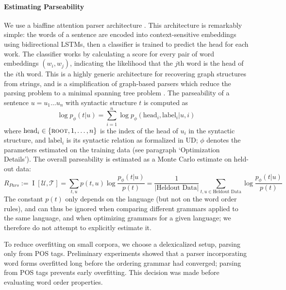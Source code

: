 \documentclass[10pt,twoside,lineno]{article}
\newcommand{\utterance}{\mathcal{U}}
\newcommand{\tree}{\mathcal{T}}
\begin{document}
\paragraph{Estimating Parseability}
We use a biaffine attention parser architecture \citep{kiperwasser2016simple,zhang2017dependency,dozat2017stanford}. This architecture is remarkably simple: the words of a sentence are encoded into context-sensitive embeddings using bidirectional LSTMs, then a classifier is trained to predict the head for each work. The classifier works by calculating a score for every pair of word embeddings $(w_i, w_j)$, indicating the likelihood that the $j$th word is the head of the $i$th word. This is a highly generic architecture for recovering graph structures from strings, and is a simplification of graph-based parsers which reduce the parsing problem to a minimal spanning tree problem \citep{mcdonald2005nonprojective}.
The parseability of a sentence $u = u_1\dots u_n$ with syntactic structure $t$ is computed as
\begin{equation}
	\log p_\phi(t|u) = \sum_{i=1}^n \log p_\phi(\text{head}_i, \text{label}_i | u, i)
\end{equation}\label{eq:pars-obj}
where $\text{head}_i \in \{\textsc{root}, 1,\dots,n\}$ is the index of the head of $u_i$ in the syntactic structure, and $\text{label}_i$ is its syntactic relation as formalized in UD; $\phi$ denotes the parameters estimated on the training data (see paragraph `Optimization Details').
The overall parseability is estimated as a Monte Carlo estimate on held-out data:
\begin{equation}\label{eq:rpars}
	R_{Pars} := \operatorname{I}[\utterance,\tree] = \sum_{t,u} p(t,u) \log \frac{p_\phi(t|u)}{p(t)} = \frac{1}{|\text{Heldout Data}|} \sum_{t,u \in \text{Heldout Data}} \log \frac{p_\phi(t|u)}{p(t)}
\end{equation}
The constant $p(t)$ only depends on the language (but not on the word order rules), and can thus be ignored when comparing different grammars applied to the same language, and when optimizing grammars for a given language; we therefore do not attempt to explicitly estimate it.


To reduce overfitting on small corpora, we choose a delexicalized setup, parsing only from POS tags. Preliminary experiments showed that a parser incorporating word forms overfitted long before the ordering grammar had converged; parsing from POS tags prevents early overfitting.
This decision was made before evaluating word order properties.
\end{document}
